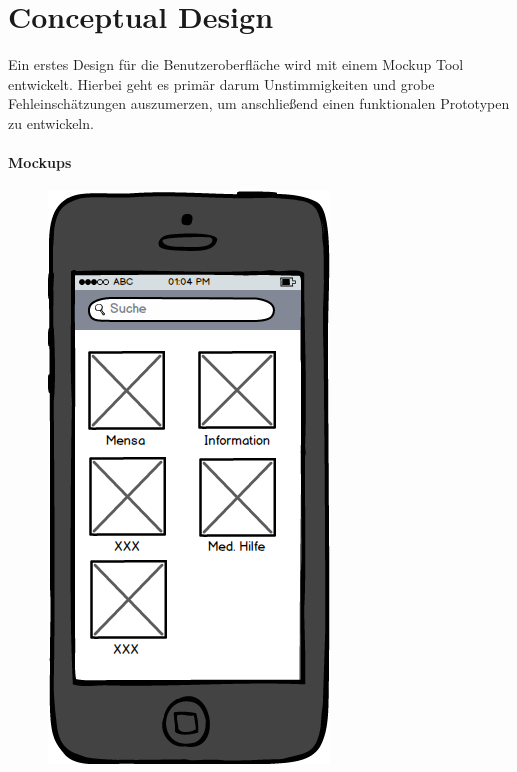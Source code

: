 \chapter{Conceptual Design}
Ein erstes Design für die Benutzeroberfläche wird mit einem Mockup Tool entwickelt. Hierbei geht es primär darum Unstimmigkeiten und grobe Fehleinschätzungen auszumerzen, um anschließend einen funktionalen Prototypen zu entwickeln.

\subsubsection*{Mockups}
\begin{figure}[ht]
\centering
\begin{minipage}[b]{.5\textwidth}
  \centering
  \includegraphics[width=.8\linewidth]{img/menu-mockup.png}

\end{minipage}
\end{figure}
